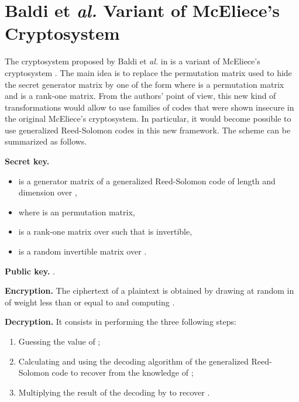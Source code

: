 \documentclass[runningheads,11pt]{llncs}
\begin{document}
\section{Baldi et \textit{al.} Variant of McEliece's Cryptosystem} \label{sec:schemeit}

The cryptosystem proposed by Baldi et \textit{al.}  in \cite{BBCRS11a} is a variant of McEliece's cryptosystem \cite{McEliece78}. The main idea is to replace the permutation matrix used to hide the secret generator matrix by one of the form  where
 is a permutation matrix and  is a rank-one matrix. From
the authors' point of view, this new kind of transformations would
allow to use  families of codes that were shown insecure in the
original McEliece's cryptosystem. In particular, it would become possible to use generalized Reed-Solomon codes in this new framework.
The scheme can be summarized as follows.

\begin{description}
	\item \textbf{Secret key.} 
          \begin{itemize}
          \item  is a generator matrix of a generalized
            Reed-Solomon code of length  and dimension  over ,  
          \item  where
             is an  permutation matrix, 
          \item  is a rank-one matrix over  such that 
            is invertible, 
          \item  is a  random invertible  matrix over .
          \end{itemize}
        \item \textbf{Public key.} . 
          
	\item \textbf{Encryption.} The ciphertext  of a plaintext
           is obtained by drawing at random 
          in  of weight less than or equal  to  and computing
          . 
          
	\item \textbf{Decryption.} It consists in performing the three
          following steps:
	\begin{enumerate}
	\item Guessing the value of  ;
	\item Calculating 
	and using the decoding algorithm of the generalized Reed-Solomon code to recover
	 from the knowledge of ;
	\item Multiplying the result of the decoding by  to recover .
	\end{enumerate}
\end{description}
\end{document}
